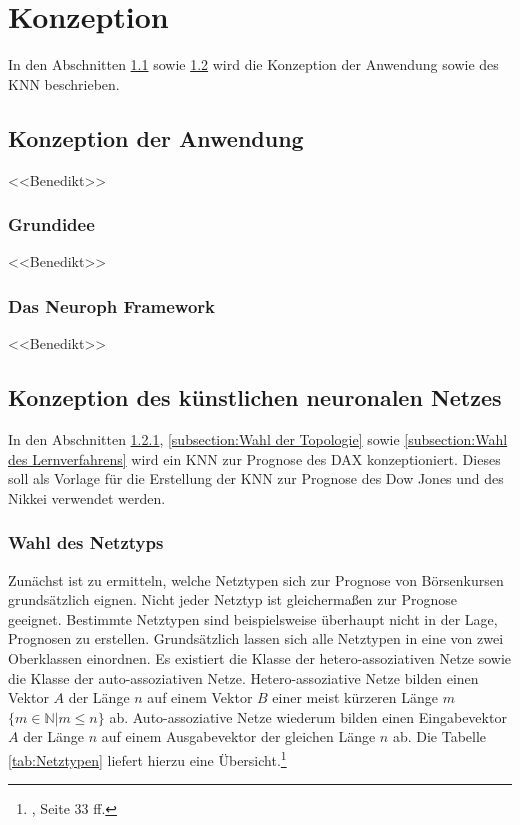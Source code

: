 \chapter{Konzeption}
\label{chapter:Konzeption}

In den Abschnitten \ref{section:Konzeption der Anwendung} sowie \ref{section:Konzeption des künstlichen neuronalen Netzes} wird die Konzeption der Anwendung sowie des KNN beschrieben.

\section{Konzeption der Anwendung}
\label{section:Konzeption der Anwendung} 

<<Benedikt>>
\Blindtext

\subsection{Grundidee}
\label{subsection:Grundidee}

<<Benedikt>>
\Blindtext

\subsection{Das Neuroph Framework}
\label{subsection:Das Neuroph Framework}

<<Benedikt>>
\Blindtext

\section{Konzeption des künstlichen neuronalen Netzes}
\label{section:Konzeption des künstlichen neuronalen Netzes}

In den Abschnitten \ref{subsection:Wahl des Netztyps}, \ref{subsection:Wahl der Topologie} sowie \ref{subsection:Wahl des Lernverfahrens} wird ein KNN zur Prognose des DAX konzeptioniert. Dieses soll als Vorlage für die Erstellung der KNN zur Prognose des Dow Jones und des Nikkei verwendet werden.

\subsection{Wahl des Netztyps}
\label{subsection:Wahl des Netztyps}

Zunächst ist zu ermitteln, welche Netztypen sich zur Prognose von Börsenkursen grundsätzlich eignen. Nicht jeder Netztyp ist gleichermaßen zur Prognose geeignet. Bestimmte Netztypen sind beispielsweise überhaupt nicht in der Lage, Prognosen zu erstellen. Grundsätzlich lassen sich alle Netztypen in eine von zwei Oberklassen einordnen. Es existiert die Klasse der hetero-assoziativen Netze sowie die Klasse der auto-assoziativen Netze. Hetero-assoziative Netze bilden einen Vektor $A$ der Länge $n$ auf einem Vektor $B$ einer meist kürzeren Länge $m$ $\{m \in \mathbb{N} | m \le n\}$ ab. Auto-assoziative Netze wiederum bilden einen Eingabevektor $A$ der Länge $n$ auf einem Ausgabevektor der gleichen Länge $n$ ab. Die Tabelle \ref{tab:Netztypen} liefert hierzu eine Übersicht.\footnote{\Vgl{}, Seite 33 ff.}


